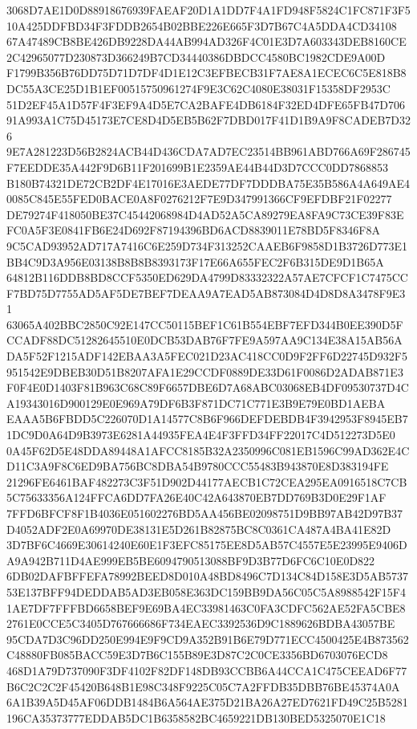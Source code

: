 \documentclass[UTF8,fontset=fandol,zihao=-4,a4paper]{ctexart}
\begin{document}
{{3068D7AE1D0D88918676939FAEAF20D1A1DD7F4A1FD948F5824C1FC871F3F510A425DDFBD34F3FDDB2654B02BBE226E665F3D7B67C4A5DDA4CD34108
67A47489CB8BE426DB9228DA44AB994AD326F4C01E3D7A603343DEB8160CE2C42965077D230873D366249B7CD34440386DBDCC4580BC1982CDE9A00D
F1799B356B76DD75D71D7DF4D1E12C3EFBECB31F7AE8A1ECEC6C5E818B8DC55A3CE25D1B1EF00515750961274F9E3C62C4080E38031F15358DF2953C
51D2EF45A1D57F4F3EF9A4D5E7CA2BAFE4DB6184F32ED4DFE65FB47D70691A993A1C75D45173E7CE8D4D5EB5B62F7DBD017F41D1B9A9F8CADEB7D326
9E7A281223D56B2824ACB44D436CDA7AD7EC23514BB961ABD766A69F286745F7EEDDE35A442F9D6B11F201699B1E2359AE44B44D3D7CCC0DD7868853
B180B74321DE72CB2DF4E17016E3AEDE77DF7DDDBA75E35B586A4A649AE40085C845E55FED0BACE0A8F0276212F7E9D347991366CF9EFDBF21F02277
DE79274F418050BE37C45442068984D4AD52A5CA89279EA8FA9C73CE39F83EFC0A5F3E0841FB6E24D692F87194396BD6ACD8839011E78BD5F8346F8A
9C5CAD93952AD717A7416C6E259D734F313252CAAEB6F9858D1B3726D773E1BB4C9D3A956E03138B8B8B8393173F17E66A655FEC2F6B315DE9D1B65A
64812B116DDB8BD8CCF5350ED629DA4799D83332322A57AE7CFCF1C7475CCF7BD75D7755AD5AF5DE7BEF7DEAA9A7EAD5AB873084D4D8D8A3478F9E31
63065A402BBC2850C92E147CC50115BEF1C61B554EBF7EFD344B0EE390D5FCCADF88DC51282645510E0DCB53DAB76F7FE9A597AA9C134E38A15AB56A
DA5F52F1215ADF142EBAA3A5FEC021D23AC418CC0D9F2FF6D22745D932F5951542E9DBEB30D51B8207AFA1E29CCDF0889DE33D61F0086D2ADAB871E3
F0F4E0D1403F81B963C68C89F6657DBE6D7A68ABC03068EB4DF09530737D4CA19343016D900129E0E969A79DF6B3F871DC71C771E3B9E79E0BD1AEBA
EAAA5B6FBDD5C226070D1A14577C8B6F966DEFDEBDB4F3942953F8945EB71DC9D0A64D9B3973E6281A44935FEA4E4F3FFD34FF22017C4D512273D5E0
0A45F62D5E48DDA89448A1AFCC8185B32A2350996C081EB1596C99AD362E4CD11C3A9F8C6ED9BA756BC8DBA54B9780CCC55483B943870E8D383194FE
21296FE6461BAF482273C3F51D902D44177AECB1C72CEA295EA0916518C7CB5C75633356A124FFCA6DD7FA26E40C42A643870EB7DD769B3D0E29F1AF
7FFD6BFCF8F1B4036E051602276BD5AA456BE02098751D9BB97AB42D97B37D4052ADF2E0A69970DE38131E5D261B82875BC8C0361CA487A4BA41E82D
3D7BF6C4669E30614240E60E1F3EFC85175EE8D5AB57C4557E5E23995E9406DA9A942B711D4AE999EB5BE6094790513088BF9D3B77D6FC6C10E0D822
6DB02DAFBFFEFA78992BEED8D010A48BD8496C7D134C84D158E3D5AB573753E137BFF94DEDDAB5AD3EB058E363DC159BB9DA56C05C5A8988542F15F4
1AE7DF7FFFBD6658BEF9E69BA4EC33981463C0FA3CDFC562AE52FA5CBE82761E0CCE5C3405D767666686F734EAEC3392536D9C1889626BDBA43057BE
95CDA7D3C96DD250E994E9F9CD9A352B91B6E79D771ECC4500425E4B873562C48880FB085BACC59E3D7B6C155B89E3D87C2C0CE3356BD6703076ECD8
468D1A79D737090F3DF4102F82DF148DB93CCBB6A44CCA1C475CEEAD6F77B6C2C2C2F45420B648B1E98C348F9225C05C7A2FFDB35DBB76BE45374A0A
6A1B39A5D45AF06DDB1484B6A564AE375D21BA26A27ED7621FD49C25B5281196CA35373777EDDAB5DC1B6358582BC4659221DB130BED5325070E1C18
}}
\end{document}
